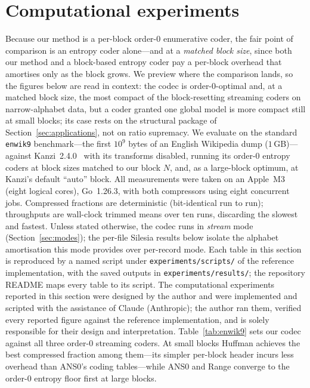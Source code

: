 \documentclass[entropy,article,submit,oneauthor,pdftex]{Definitions/mdpi}
\begin{document}
\section{Computational experiments}\label{sec:computational-experiments}
Because our method is a per-block order-$0$ enumerative coder, the fair point of
comparison is an entropy coder alone---and at a \emph{matched block size}, since
both our method and a block-based entropy coder pay a per-block overhead that
amortises only as the block grows. We preview where the comparison lands, so the figures
below are read in context: the codec is order-$0$-optimal and, at a matched block size,
the most compact of the block-resetting streaming coders on narrow-alphabet data, but a
coder granted one global model is more compact still at small blocks; its case rests on
the structural package of Section~\ref{sec:applications}, not on ratio supremacy. We
evaluate on the standard \texttt{enwik9}
benchmark---the first $10^{9}$ bytes of an English Wikipedia dump
($1$\,GB)---against Kanzi~2.4.0~\cite{langlet2011} with its transforms disabled,
running its order-$0$ entropy coders at block sizes
matched to our block $N$, and, as a large-block optimum, at Kanzi's default
``auto'' block. All measurements were taken on an Apple~M3 (eight logical cores),
Go~1.26.3, with both compressors using eight concurrent jobs. Compressed
fractions are deterministic (bit-identical run to run); throughputs are
wall-clock trimmed means over ten runs, discarding the slowest and fastest.
Unless stated otherwise, the codec runs in \emph{stream} mode
(Section~\ref{sec:modes}); the per-file Silesia results below isolate the alphabet
amortisation this mode provides over per-record mode. Each table in this section is
reproduced by a named script under \texttt{experiments/scripts/} of the reference
implementation, with the saved outputs in \texttt{experiments/results/}; the
repository README maps every table to its script. The computational experiments
reported in this section were designed by the author and were implemented and scripted
with the assistance of Claude (Anthropic); the author ran them, verified every reported
figure against the reference implementation, and is solely responsible for their design
and interpretation.
Table~\ref{tab:enwik9} sets our codec against all three order-$0$ streaming
coders. At small blocks Huffman achieves the best compressed fraction among
them---its simpler per-block header incurs less overhead than ANS0's coding
tables---while ANS0 and Range converge to the order-$0$ entropy floor first at
large blocks.
\end{document}
